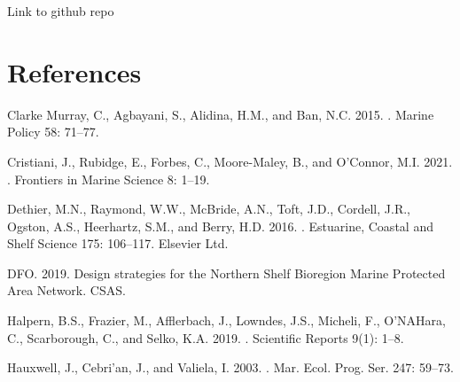 \documentclass[12pt]{article}\usepackage[]{graphicx}\usepackage[]{color}
\begin{document}
Link to github repo

\clearpage

\hypertarget{references}{%
\section{References}\label{references}}

\noindent \vspace{-2em} \setlength{\parindent}{-0.2in} \setlength{\leftskip}{0.2in} \setlength{\parskip}{8pt}

\hypertarget{refs}{}
\begin{CSLReferences}{1}{0}
%
Clarke Murray, C., Agbayani, S., Alidina, H.M., and Ban, N.C. 2015. . Marine Policy 58: 71--77.

%
Cristiani, J., Rubidge, E., Forbes, C., Moore-Maley, B., and O'Connor, M.I. 2021. . Frontiers in Marine Science 8: 1--19.

%
Dethier, M.N., Raymond, W.W., McBride, A.N., Toft, J.D., Cordell, J.R., Ogston, A.S., Heerhartz, S.M., and Berry, H.D. 2016. . Estuarine, Coastal and Shelf Science 175: 106--117. {Elsevier Ltd}.

%
DFO. 2019. Design strategies for the {Northern Shelf Bioregion Marine Protected Area Network}. CSAS.

%
Halpern, B.S., Frazier, M., Afflerbach, J., Lowndes, J.S., Micheli, F., O'NAHara, C., Scarborough, C., and Selko, K.A. 2019. . Scientific Reports 9(1): 1--8.

%
Hauxwell, J., Cebri'an, J., and Valiela, I. 2003. . Mar. Ecol. Prog. Ser. 247: 59--73.


\end{CSLReferences}
\end{document}
